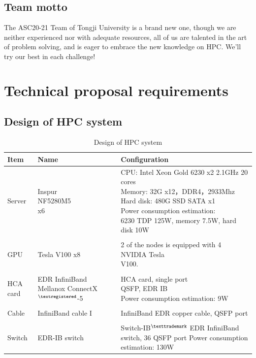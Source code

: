 \documentclass[a4paper, 11pt]{article}
\begin{document}
		\subsection{Team motto} 
		
			The ASC20-21 Team of Tongji University is a brand new one, though we are neither experienced nor with adequate resources, all of us are talented in the art of problem solving, and is eager to embrace the new knowledge on HPC. We'll try our best in each challenge!
		
		
	\section{Technical proposal requirements}

		\subsection{Design of HPC system}
			\begin{table}[H]
				\begin{center}
					\caption{Design of HPC system}
					\label{tab1}  
					\begin{tabular}{l l l}
						\toprule
						Item & Name & Configuration\\			
						\midrule
						Server & \makecell[l]{Inspur \\NF5280M5 \\x6} & \makecell[l]{CPU: Intel Xeon Gold 6230 x2 2.1GHz 20 cores \\ Memory: 32G x12，DDR4，2933Mhz \\ Hard disk: 480G SSD SATA x1 \\ Power consumption estimation:\\ 6230 TDP 125W, memory 7.5W, hard disk 10W}\\
						&&\\
						GPU & Tesla V100 x8 & \makecell[l]{2 of the nodes is equipped with 4 NVIDIA Tesla \\V100.}\\
						&&\\
						HCA card & \makecell[l]{EDR\\
							InfiniBand Mellanox \\ConnectX$^{\tiny{\textregistered}}$-5} & \makecell[l]{HCA card, single port\\
							QSFP, EDR IB\\
							Power consumption estimation: 9W
						}\\
						&&\\
						Cable & InfiniBand cable I & InfiniBand EDR copper cable, QSFP port\\
						&&\\
						Switch & EDR-IB switch & \makecell[l]{Switch-IB$^{\tiny{\texttrademark}}$ EDR InfiniBand switch, \\36 QSFP port\\
							Power consumption estimation: 130W
						}\\
						\bottomrule
					\end{tabular}
				\end{center}
			\end{table}
\end{document}

